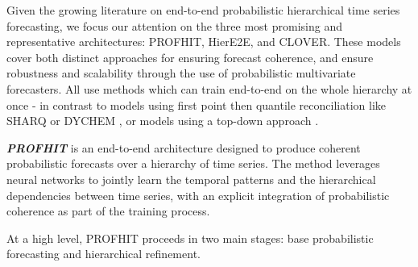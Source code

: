 \documentclass[letterpaper]{article}
\begin{document}
Given the growing literature on end-to-end probabilistic hierarchical time series forecasting, we focus our attention on the three most promising and representative architectures: PROFHIT, HierE2E, and CLOVER. These models cover both distinct approaches for ensuring forecast coherence, and ensure robustness and scalability through the use of probabilistic multivariate forecasters. All use methods which can train end-to-end on the whole hierarchy at once - in contrast to models using first point then quantile reconciliation like SHARQ or DYCHEM \cite{SHARQ}, \cite{DYCHEM} or models using a top-down approach \cite{Dirichlet}.

\textit{\textbf{PROFHIT}} is an end-to-end architecture designed to produce coherent probabilistic forecasts over a hierarchy of time series. The method leverages neural networks to jointly learn the temporal patterns and the hierarchical dependencies between time series, with an explicit integration of probabilistic coherence as part of the training process.

At a high level, PROFHIT proceeds in two main stages: base probabilistic forecasting and hierarchical refinement.
\end{document}
